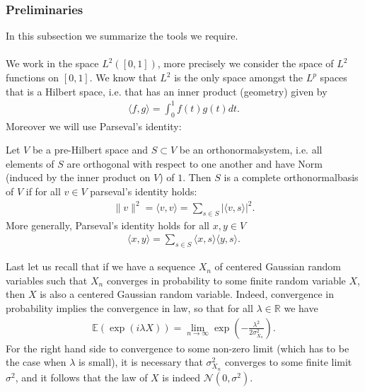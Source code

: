 \documentclass[../mainfile.tex]{subfiles}
\begin{document}
\subsubsection{Preliminaries}
In this subsection we summarize the tools we require. \\
\\
We work in the space $L^2([0,1])$, more precisely we consider the space of $L^2$ functions on $[0,1]$. We know that $L^2$ is the only space amongst the $L^p$ spaces that is a Hilbert space, i.e. that has an inner product (geometry) given by
\begin{align*}
\langle f,g \rangle = \int_0^1 f(t)g(t)dt.
\end{align*}
Moreover we will use Parseval's identity:
\begin{thm} Let $V$ be a pre-Hilbert space and $S \subset V$ be an orthonormalsystem, i.e. all elements of $S$ are orthogonal with respect to one another and have Norm (induced by the inner product on $V$) of $1$. Then $S$ is a complete orthonormalbasis of $V$ if for all $v \in V$ parseval's identity holds:
\begin{align*}
\|v\|^2 = \langle v, v \rangle = \sum_{s \in S} | \langle v, s \rangle |^2.
\end{align*}
More generally, Parseval's identity holds for all $x,y \in V$ 
\begin{align*}
\langle x,y\rangle = \sum_{s \in S} \langle x, s\rangle \langle y ,s \rangle.
\end{align*} 
\end{thm}
Last let us recall that if we have a sequence $X_n$ of centered Gaussian random variables such that $X_n$ converges in probability to some finite random variable $X$, then $X$ is also a centered Gaussian random variable. Indeed, convergence in probability implies the convergence in law, so that for all $\lambda \in \mathbb{R}$ we have
\begin{align*}
\mathbb{E}(\exp ( i \lambda X))= \lim_{n \to \infty} \exp\left( - \frac{\lambda^2}{2 \sigma_{X_n}^2}\right).
\end{align*}
For the right hand side to convergence to some non-zero limit (which has to be the case when $\lambda$ is small), it is necessary that $\sigma_{X_n}^2$ converges to some finite limit $\sigma^2$, and it follows that the law of $X$ is indeed $\mathcal{N}(0, \sigma^2)$.
\newpage
\end{document}
